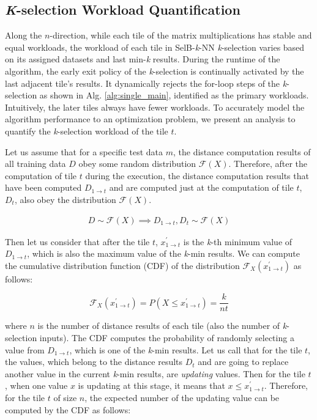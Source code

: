 \documentclass[12pt]{extbook}
\begin{document}
\subsection{\textit{K}-selection Workload Quantification \label{kSel}}

Along the $n$-direction, while each tile of the matrix multiplications has stable and equal workloads, the workload of each tile in SelB-\textit{k}-NN \textit{k}-selection varies based on its assigned datasets and last min-\textit{k} results. During the runtime of the algorithm, the early exit policy of the \textit{k}-selection is continually activated by the last adjacent tile's results. It dynamically rejects the for-loop steps of the \textit{k}-selection as shown in Alg. \ref{alg:single_main}, identified as the primary workloads. Intuitively, the later tiles always have fewer workloads. To accurately model the algorithm performance to an optimization problem, we present an analysis to quantify the \textit{k}-selection workload of the tile $t$.

Let us assume that for a specific test data $m$, the distance computation results of all training data $D$ obey some random distribution $\mathcal{F}(X)$. Therefore, after the computation of tile $t$ during the execution, the distance computation results that have been computed $D_{1 \to t}$ and are computed just at the computation of tile $t$, $D_{t}$, also obey the distribution $\mathcal{F}(X)$.

\begin{equation}
    \begin{aligned}
        D \sim \mathcal{F}(X) \implies D_{1 \to t}, D_{t} \sim \mathcal{F}(X)  
    \end{aligned}
\end{equation}


Then let us consider that after the tile $t$, $x^{\prime}_{1 \to t}$ is the \textit{k}-th minimum value of $D_{1 \to t}$, which is also the maximum value of the \textit{k}-min results. We can compute the cumulative distribution function (CDF) of the distribution $\mathcal{F}_{X}(x^{\prime}_{1 \to t})$ as follows:

\begin{equation}
    \mathcal{F}_{X}(x^{\prime}_{1 \to t}) = P(X \le x^{\prime}_{1 \to t}) = \frac{k}{nt}
\end{equation}

where $n$ is the number of distance results of each tile (also the number of \textit{k}-selection inputs). The CDF computes the probability of randomly selecting a value from $D_{1 \to t}$, which is one of the \textit{k}-min results. Let us call that for the tile $t$, the values, which belong to the distance results $D_{t}$ and are going to replace another value in the current \textit{k}-min results, are \textit{updating} values. Then for the tile $t$, when one value $x$ is updating at this stage, it means that $x \le x^{\prime}_{1 \to t}$. Therefore, for the tile $t$ of size $n$, the expected number of the updating value can be computed by the CDF as follows:
\end{document}
